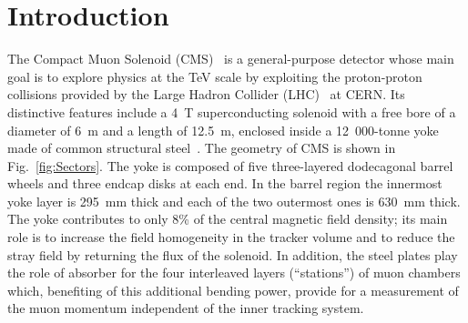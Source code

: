 \section{Introduction}
The Compact Muon Solenoid (CMS)~\cite{CMS} is a general-purpose
detector whose main goal is to explore physics at the TeV scale by
exploiting the proton-proton collisions provided by the Large
Hadron Collider (LHC)~\cite{LHC} at CERN. Its distinctive features include
a 4~T superconducting solenoid with a free bore of a diameter of 6~m
and a length of 12.5~m, enclosed inside a \mbox{12\ 000}-tonne yoke made of
common structural steel~\cite{MagnetTDR}. The geometry of CMS is shown in
Fig.~\ref{fig:Sectors}. The yoke is composed of
five three-layered dodecagonal barrel wheels
and three endcap disks at each end. 
In the barrel region the innermost yoke layer is 295~mm
thick and each of the two outermost ones is 630~mm thick.
The yoke contributes to only 8\% of the central magnetic field
density; its main role is to increase the field homogeneity in the
tracker volume and to reduce the stray field by returning the flux of the
solenoid. In addition, the steel plates play the role of absorber for the four
interleaved layers (``stations'') of muon chambers which, benefiting of
this additional bending power, provide for a measurement of the muon
momentum independent of the inner tracking system. 


